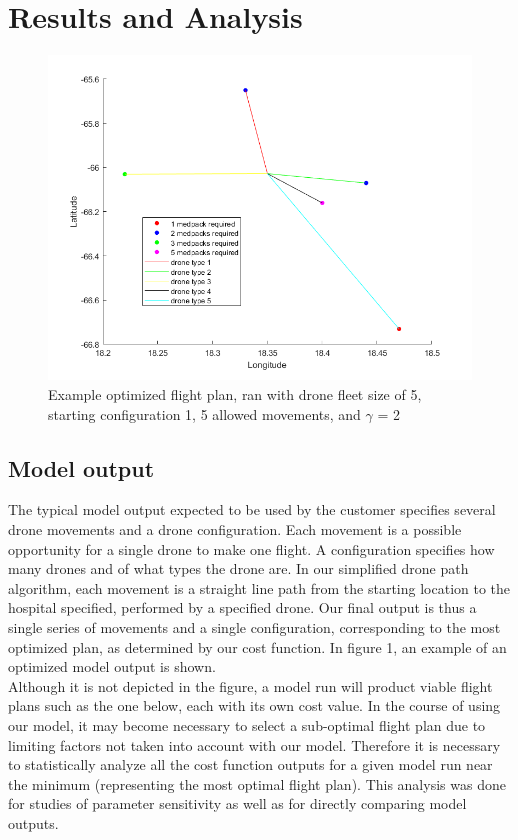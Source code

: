 \documentclass[twocolumn,10pt]{asme2ej}
\begin{document}
\section{Results and Analysis}
\begin{figure}
	\centering
	\includegraphics[width=0.7\linewidth]{../example_flight_plan}
	\caption[Fig 1.]{Example optimized flight plan, ran with drone fleet size of 5, starting configuration 1, 5 allowed movements, and $\gamma$ = 2}
	\label{Fig 1.}
\end{figure}

\subsection{Model output}
The typical model output expected to be used by the customer specifies several drone movements and a drone configuration. Each movement is a possible opportunity for a single drone to make one flight. A configuration specifies how many drones and of what types the drone are. In our simplified drone path algorithm, each movement is a straight line path from the starting location to the hospital specified, performed by a specified drone. Our final output is thus a single series of movements and a single configuration, corresponding to the most optimized plan, as determined by our cost function. In figure 1, an example of an optimized model output is shown. \\
Although it is not depicted in the figure, a model run will product viable flight plans such as the one below, each with its own cost value. In the course of using our model, it may become necessary to select a sub-optimal flight plan due to limiting factors not taken into account with our model. Therefore it is necessary to statistically analyze all the cost function outputs for a given model run near the minimum (representing the most optimal flight plan). This analysis was done for studies of parameter sensitivity as well as for directly comparing model outputs.
\end{document}
